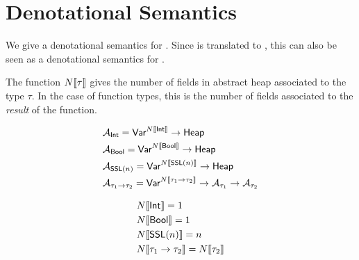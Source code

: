\section{Denotational Semantics}

We give a denotational semantics for \PikaCore. Since \Pika{} is translated to \PikaCore, this can
also be seen as a denotational semantics for \Pika.

The function $N\llbracket \tau \rrbracket$ gives the number of fields in abstract
heap associated to the type $\tau$. In the case of function types, this
is the number of fields associated to the \textit{result} of the function.

\begin{align*}
  &\mathcal{A}_{\textsf{Int}} = \textsf{Var}^{N\llbracket \textsf{Int} \rrbracket} \rightarrow \textsf{Heap}
  \\
  &\mathcal{A}_{\textsf{Bool}} = \textsf{Var}^{N\llbracket \textsf{Bool} \rrbracket} \rightarrow \textsf{Heap}
  \\
  &\mathcal{A}_{\textsf{SSL}(n)} = \textsf{Var}^{N\llbracket \textsf{SSL}(n) \rrbracket} \rightarrow \textsf{Heap}
  \\
  &\mathcal{A}_{\tau_1 \rightarrow \tau_2} = \textsf{Var}^{N\llbracket \tau_1 \rightarrow \tau_2 \rrbracket} \rightarrow \mathcal{A}_{\tau_1} \rightarrow \mathcal{A}_{\tau_2}
\end{align*}

\begin{align*}
  &N\llbracket \textsf{Int} \rrbracket = 1
  \\
  &N\llbracket \textsf{Bool} \rrbracket = 1
  \\
  &N\llbracket \textsf{SSL}(n) \rrbracket = n
  \\
  &N\llbracket \tau_1 \rightarrow \tau_2 \rrbracket = N\llbracket \tau_2 \rrbracket
\end{align*}
\\


